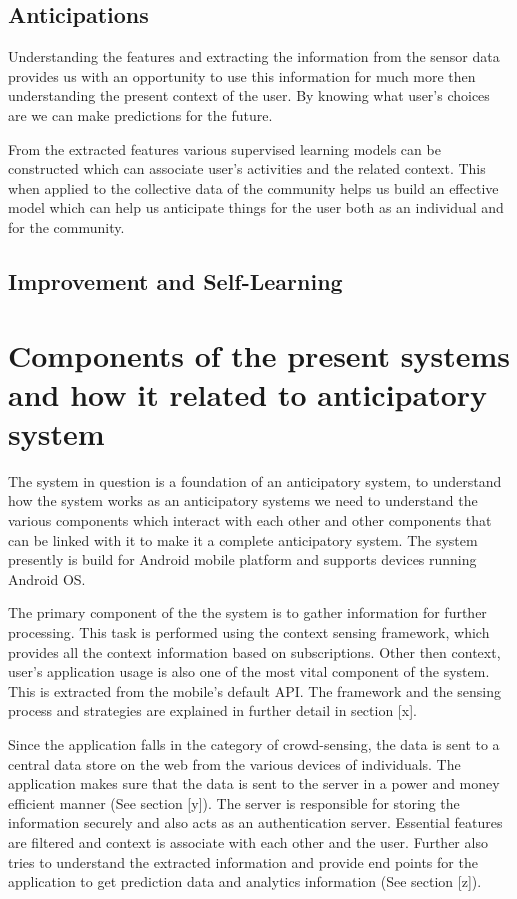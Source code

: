 \documentclass[12pt]{report}
\begin{document}
\subsection{Anticipations}
Understanding the features and extracting the information from the sensor data provides us with an opportunity to use this information for much more then understanding the present context of the user. By knowing what user's choices are we can make predictions for the future.

From the extracted features various supervised learning models can be constructed which can associate user's activities and the related context. This when applied to the collective data of the community helps us build an effective model which can help us anticipate things for the user both as an individual and for the community.


\subsection{Improvement and Self-Learning}


\section{Components of the present systems and how it related to anticipatory system}

The system in question is a foundation of an anticipatory system, to understand how the system works as an anticipatory systems we need to understand the various components which interact with each other and other components that can be linked with it to make it a complete anticipatory system. The system presently is build for Android mobile platform and supports devices running Android OS.

The primary component of the the system is to gather information for further processing. This task is performed using the context sensing framework, which provides all the context information based on subscriptions. Other then context, user's application usage is also one of the most vital component of the system. This is extracted from the mobile's default API. The framework and the sensing process and strategies are explained in further detail in section [x].

Since the application falls in the category of crowd-sensing, the data is sent to a central data store on the web from the various devices of individuals. The application makes sure that the data is sent to the server in a power and money efficient manner (See section [y]). The server is responsible for storing the information securely and also acts as an authentication server. Essential features are filtered and context is associate with each other and the user. Further also tries to understand the extracted information and provide end points for the application to get prediction data and analytics information (See section [z]).
\end{document}
